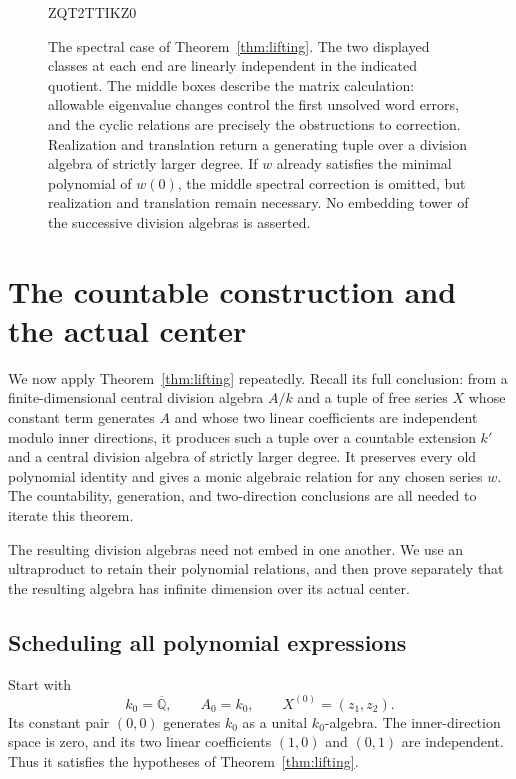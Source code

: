 \documentclass[11pt]{article}
\theoremstyle{definition}
\theoremstyle{remark}
\numberwithin{equation}{section}
\begin{document}
\begin{figure}[tbp]

ZQT2TTIKZ0

\caption{The spectral case of Theorem~\ref{thm:lifting}.
The two displayed classes at each end are linearly independent in the
indicated quotient. The middle boxes describe the matrix calculation:
allowable eigenvalue changes control the first unsolved word errors,
and the cyclic relations are precisely the obstructions to correction.
Realization and translation return a generating tuple over a division
algebra of strictly larger degree. If $w$ already satisfies the minimal
polynomial of $w(0)$, the middle spectral correction is omitted, but
realization and translation remain necessary. No embedding tower of
the successive division algebras is asserted.}
\label{fig:response-interfaces}
\end{figure}
 

\section{The countable construction and the actual center}
\label{sec:countable-construction}

We now apply Theorem~\ref{thm:lifting} repeatedly.  Recall its
full conclusion: from a finite-dimensional central division algebra $A/k$
and a tuple of free series $X$ whose constant term generates $A$ and whose
two linear coefficients are independent modulo inner directions, it
produces such a tuple over a countable extension $k'$ and a central
division algebra of strictly larger degree.  It preserves every old
polynomial identity and gives a monic algebraic relation for any chosen
series $w$.  The countability, generation, and two-direction conclusions
are all needed to iterate this theorem.

The resulting division algebras need not embed in one another.  We use
an ultraproduct to retain their polynomial relations, and then prove
separately that the resulting algebra has infinite dimension over its
actual center.

\subsection{Scheduling all polynomial expressions}

Start with
\[
 k_0=\overline{\mathbb Q},\qquad A_0=k_0,\qquad
 X^{(0)}=(z_1,z_2).
\]
Its constant pair $(0,0)$ generates $k_0$ as a unital $k_0$-algebra.
The inner-direction space is zero, and its two linear coefficients
$(1,0)$ and $(0,1)$ are independent.  Thus it satisfies the hypotheses
of Theorem~\ref{thm:lifting}.
\end{document}
